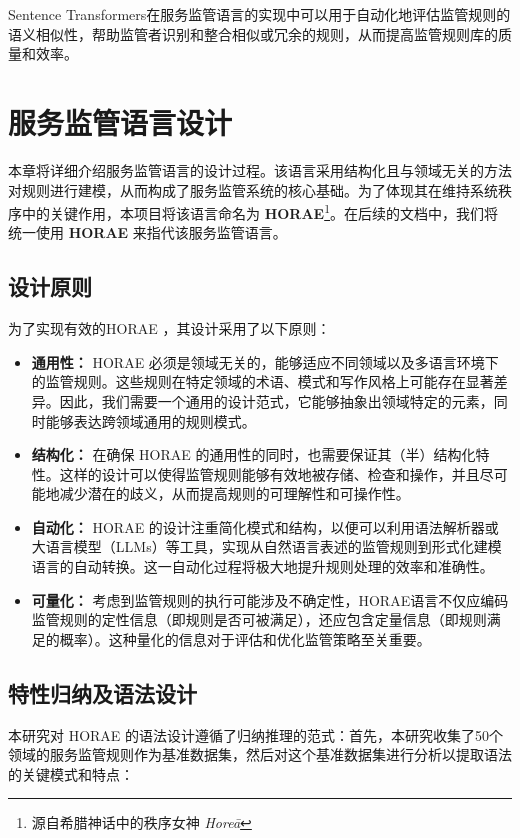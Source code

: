 Sentence Transformers在服务监管语言的实现中可以用于自动化地评估监管规则的语义相似性，帮助监管者识别和整合相似或冗余的规则，从而提高监管规则库的质量和效率。

\cleardoublepage

\section{服务监管语言设计}

本章将详细介绍服务监管语言的设计过程。该语言采用结构化且与领域无关的方法对规则进行建模，从而构成了服务监管系统的核心基础。为了体现其在维持系统秩序中的关键作用，本项目将该语言命名为 \textbf{HORAE}\footnote{源自希腊神话中的秩序女神 \textit{Horeā}}。在后续的文档中，我们将统一使用 \textbf{HORAE }  来指代该服务监管语言。

\subsection{设计原则}

为了实现有效的HORAE ，其设计采用了以下原则：

\begin{itemize}
    \item \textbf{通用性：} HORAE 必须是领域无关的，能够适应不同领域以及多语言环境下的监管规则。这些规则在特定领域的术语、模式和写作风格上可能存在显著差异。因此，我们需要一个通用的设计范式，它能够抽象出领域特定的元素，同时能够表达跨领域通用的规则模式。
    \item \textbf{结构化：} 在确保 HORAE 的通用性的同时，也需要保证其（半）结构化特性。这样的设计可以使得监管规则能够有效地被存储、检查和操作，并且尽可能地减少潜在的歧义，从而提高规则的可理解性和可操作性。
    \item \textbf{自动化：} HORAE 的设计注重简化模式和结构，以便可以利用语法解析器或大语言模型（LLMs）等工具，实现从自然语言表述的监管规则到形式化建模语言的自动转换。这一自动化过程将极大地提升规则处理的效率和准确性。
    \item \textbf{可量化：} 考虑到监管规则的执行可能涉及不确定性，HORAE语言不仅应编码监管规则的定性信息（即规则是否可被满足），还应包含定量信息（即规则满足的概率）。这种量化的信息对于评估和优化监管策略至关重要。
\end{itemize}

\subsection{特性归纳及语法设计}

本研究对 HORAE 的语法设计遵循了归纳推理的范式：首先，本研究收集了50个领域的服务监管规则作为基准数据集，然后对这个基准数据集进行分析以提取语法的关键模式和特点：

